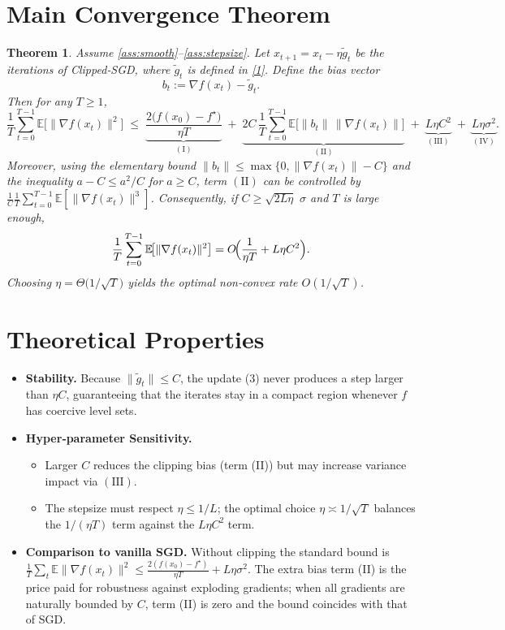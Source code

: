 \documentclass{article}
\newtheorem{theorem}{Theorem}
\newcommand{\E}{\mathbb{E}}
\begin{document}
\section*{Main Convergence Theorem}
\begin{theorem}\label{thm:main}
Assume \ref{ass:smooth}–\ref{ass:stepsize}. Let $x_{t+1}=x_t-\eta\tilde g_t$ be the
iterations of Clipped‑SGD, where $\tilde g_t$ is defined in \eqref{1}.
Define the bias vector 
\[
b_t:=\nabla f(x_t)-\tilde g_t .
\]
Then for any $T\ge1$,
\[
\frac{1}{T}\sum_{t=0}^{T-1}\E\!\bigl[\|\nabla f(x_t)\|^2\bigr]
\;\le\;
\underbrace{\frac{2\bigl(f(x_0)-f^\star\bigr)}{\eta T}}_{(\mathrm{I})}
\;+\;
\underbrace{2C\,\frac{1}{T}\sum_{t=0}^{T-1}\E\!\bigl[\|b_t\|\,\|\nabla f(x_t)\|\bigr]}_{(\mathrm{II})}
\;+\;
\underbrace{L\eta C^2}_{(\mathrm{III})}
\;+\;
\underbrace{L\eta\sigma^2}_{(\mathrm{IV})}.
\]
Moreover, using the elementary bound $\|b_t\|\le\max\{0,\|\nabla f(x_t)\|-C\}$
and the inequality $a-C\le a^2/C$ for $a\ge C$, term $(\mathrm{II})$ can be
controlled by $\frac{1}{C}\frac{1}{T}\sum_{t=0}^{T-1}\E[\|\nabla f(x_t)\|^3]$.
Consequently, if $C\ge\sqrt{2L\eta}\,\,\sigma$ and $T$ is large enough,
\[
\frac{1}{T}\sum_{t=0}^{T-1}\E\!\bigl[\|\nabla f(x_t)\|^2\bigr]
= O\!\Bigl(\frac{1}{\eta T}+L\eta C^2\Bigr).
\]
Choosing $\eta=\Theta\!\bigl(1/\sqrt{T}\bigr)$ yields the optimal
non‑convex rate $O(1/\sqrt{T})$.
\end{theorem}

\section*{Theoretical Properties}
\begin{itemize}
\item \textbf{Stability.} Because $\|\tilde g_t\|\le C$, the update (3) never
produces a step larger than $\eta C$, guaranteeing that the iterates stay in a
compact region whenever $f$ has coercive level sets.
\item \textbf{Hyper‑parameter Sensitivity.}
    \begin{itemize}
        \item Larger $C$ reduces the clipping bias (term (II)) but may increase
        variance impact via $(\mathrm{III})$.
        \item The stepsize must respect $\eta\le1/L$; the optimal choice
        $\eta\asymp 1/\sqrt{T}$ balances the $1/(\eta T)$ term against the
        $L\eta C^2$ term.
    \end{itemize}
\item \textbf{Comparison to vanilla SGD.}
    Without clipping the standard bound is
    $\frac{1}{T}\sum_{t}\E\|\nabla f(x_t)\|^2\le
    \frac{2(f(x_0)-f^\star)}{\eta T}+L\eta\sigma^2$.
    The extra bias term (II) is the price paid for robustness against exploding
    gradients; when all gradients are naturally bounded by $C$, term (II) is
    zero and the bound coincides with that of SGD.
\end{itemize}
\end{document}
